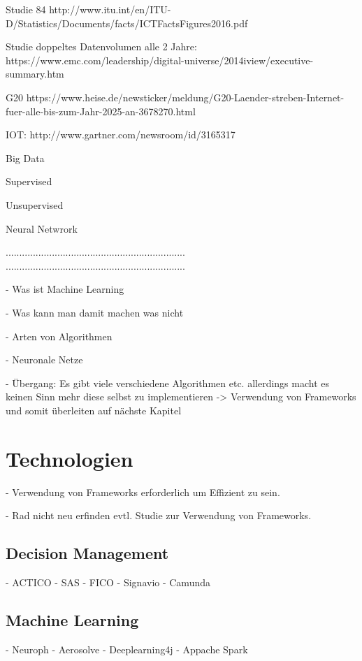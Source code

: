 Studie 84%
http://www.itu.int/en/ITU-D/Statistics/Documents/facts/ICTFactsFigures2016.pdf 

Studie doppeltes Datenvolumen alle 2 Jahre:
https://www.emc.com/leadership/digital-universe/2014iview/executive-summary.htm

G20
https://www.heise.de/newsticker/meldung/G20-Laender-streben-Internet-fuer-alle-bis-zum-Jahr-2025-an-3678270.html

IOT:
http://www.gartner.com/newsroom/id/3165317

Big Data

Supervised 

Unsupervised

Neural Netwrork

..................................................................
..................................................................

- Was ist Machine Learning

- Was kann man damit machen was nicht

- Arten von Algorithmen 

- Neuronale Netze 

- Übergang: Es gibt viele verschiedene Algorithmen etc. allerdings macht es keinen Sinn mehr diese selbst zu implementieren -> Verwendung von Frameworks und somit überleiten auf nächste Kapitel

\section{Technologien}
\label{sec:Technologien2}

- Verwendung von Frameworks erforderlich um Effizient zu sein.

- Rad nicht neu erfinden evtl. Studie zur Verwendung von Frameworks.

\subsection{Decision Management}
\label{subsec:Decision_Management2}

- ACTICO 
- SAS
- FICO 
- Signavio
- Camunda

\subsection{Machine Learning}
\label{subsec:Machine_Learning2}

- Neuroph
- Aerosolve 
- Deeplearning4j
- Appache Spark

